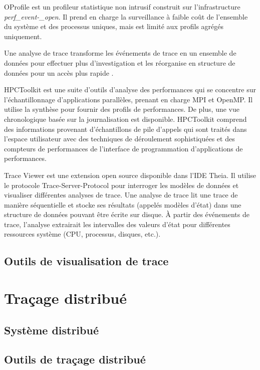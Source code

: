 OProfile \cite{sourceforgeAboutOProfile} est un profileur statistique non intrusif construit sur l'infrastructure \textit{perf\_event-\_open}. Il prend en charge la surveillance à faible coût de l'ensemble du système et des processus uniques, mais est limité aux profils agrégés uniquement.

Une analyse de trace transforme les événements de trace en un ensemble de données pour effectuer plus d'investigation et les réorganise en structure de données pour un accès plus rapide \cite{prieur2018r}.

HPCToolkit \cite{adhianto2010hpctoolkit} est une suite d'outils d'analyse des performances qui se concentre sur l'échantillonnage d'applications parallèles, prenant en charge MPI et OpenMP. Il utilise la synthèse pour fournir des profils de performances. De plus, une vue chronologique basée sur la journalisation est disponible. HPCToolkit comprend des informations provenant d'échantillons de pile d'appels qui sont traités dans l'espace utilisateur avec des techniques de déroulement sophistiquées et des compteurs de performances de l'interface de programmation d'applications de performances.

Trace Viewer est une extension open source disponible dans l'IDE Theia. Il utilise le protocole Trace-Server-Protocol pour interroger les modèles de données et visualiser différentes analyses de trace. Une analyse de trace lit une trace de manière séquentielle et stocke ses résultats (appelés modèles d'état) dans une structure de données pouvant être écrite sur disque. À partir des événements de trace, l'analyse extrairait les intervalles des valeurs d'état pour différentes ressources système (CPU, processus, disques, etc.). \cite{chen2021distributed}


\subsection{Outils de visualisation de trace}




\section{Traçage distribué}

\subsection{Système distribué}

\subsection{Outils de traçage distribué}

